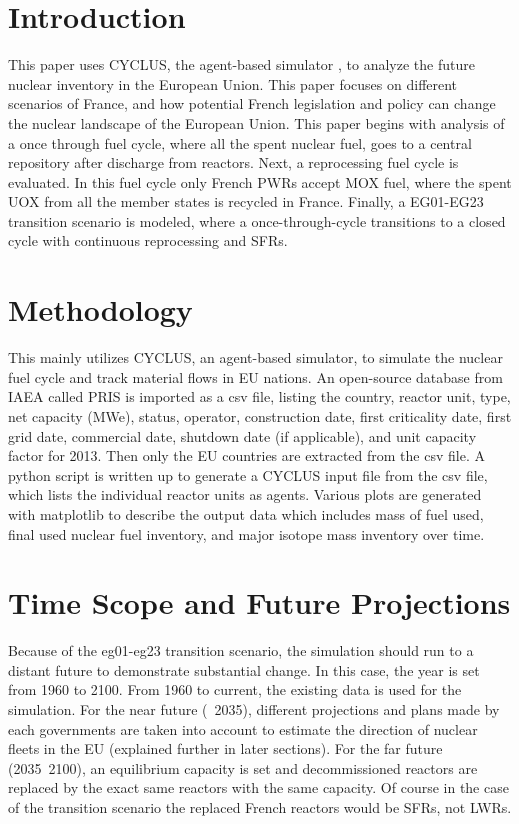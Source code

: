 \section{Introduction}
This paper uses CYCLUS, the agent-based simulator \cite{huff_fundamental_2016}, to analyze
the future nuclear inventory in the European Union. This paper focuses on different scenarios of France,
and how potential French legislation and policy can change the nuclear landscape of the European
Union. This paper begins with analysis of a once through fuel cycle, where all the spent nuclear fuel,
goes to a central repository after discharge from reactors. Next, a reprocessing fuel cycle is evaluated.
In this fuel cycle only French \gls{PWR}s accept \gls{MOX} fuel, where the spent \gls{UOX} from
all the member states is recycled in France. Finally, a EG01-EG23 transition scenario \cite{wigeland_nuclear_2014}
is modeled,
where a once-through-cycle transitions to a closed cycle with continuous reprocessing and \gls{SFR}s. 

\section{Methodology}
This mainly utilizes CYCLUS, an agent-based simulator, to simulate the nuclear fuel cycle
and track material flows in EU nations. An open-source database from \gls{IAEA} called
\gls{PRIS} is imported as a csv file, listing the country, reactor unit, type, net capacity (MWe), status,
operator, construction date, first criticality date, first grid date, commercial date, shutdown
date (if applicable), and unit capacity factor for 2013. Then only the EU countries are extracted
from the csv file. A python script is written up to generate a CYCLUS input file from the csv file,
which lists the individual reactor units as agents. Various plots are 
generated with matplotlib to describe the output data which includes mass of fuel used, final used nuclear fuel
inventory, and major isotope mass inventory over time.


\section{Time Scope and Future Projections}
Because of the eg01-eg23 transition scenario, the simulation should run to a distant
future to demonstrate substantial change. In this case, the year is set from
1960 to 2100. From 1960 to current, the existing data is used for the simulation.
For the near future (~2035), different projections and plans
made by each governments are taken
into account to estimate the direction of nuclear fleets in the EU (explained
further in later sections). For the far future (2035~2100), an equilibrium capacity
is set and decommissioned reactors are replaced by the exact
same reactors with the same
capacity. Of course in the case of the transition scenario the replaced French reactors
would be SFRs, not LWRs.

